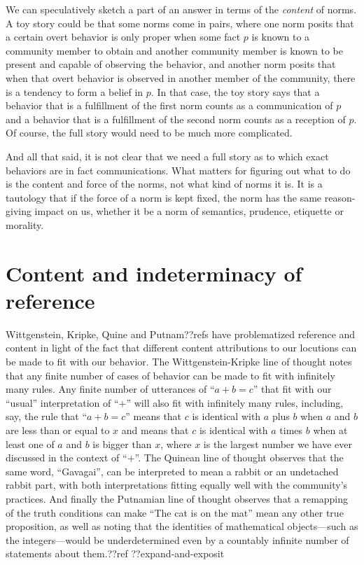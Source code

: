We can speculatively sketch a part of an answer in terms of the \textit{content} of norms. A toy story could be that 
some norms come in pairs, where one norm posits that a certain overt behavior is only proper when some fact $p$ is known to a 
community member to obtain and another community member is known to be present and capable of observing the behavior, and another 
norm posits that when that overt behavior is observed in another member of the community, there is a tendency to form a belief 
in $p$. In that case, the toy story says that a behavior that is a fulfillment of the first norm counts as a communication 
of $p$ and a behavior that is a fulfillment of the second norm counts as a reception of $p$. Of course, the full story would need
to be much more complicated.

And all that said, it is not clear that we need a full story as to which exact behaviors are in fact communications. What matters
for figuring out what to do is the content and force of the norms, not what kind of norms it is. It is a tautology that if the 
force of a norm is kept fixed, the norm has the same reason-giving impact on us, whether it be a norm of semantics, prudence, 
etiquette or morality. 

\section{Content and indeterminacy of reference}
Wittgenstein, Kripke, Quine and Putnam??refs have problematized reference and content in light of the fact that different
content attributions to our locutions can be made to fit with our behavior. The Wittgenstein-Kripke line of thought notes
that any finite number of cases of behavior can be made to fit with infinitely many rules. Any finite number of utterances
of ``$a+b=c$'' that fit with our ``usual'' interpretation of ``$+$'' will also fit with infinitely many rules, including,
say, the rule that ``$a+b=c$'' means that $c$ is identical with $a$ plus $b$ when $a$ and $b$ are less than or equal to $x$ and 
means that $c$ is identical with $a$ times $b$ when at least one of $a$ and $b$ is bigger than $x$, where $x$ is the largest
number we have ever discussed in the context of ``$+$''. The Quinean line of thought observes that the same word, ``Gavagai'',
can be interpreted to mean a rabbit or an undetached rabbit part, with both interpretations fitting equally well with the
community's practices. And finally the Putnamian line of thought observes that a remapping of the truth conditions can make
``The cat is on the mat'' mean any other true proposition, as well as noting that the identities of mathematical objects---such as
the integers---would be underdetermined even by a countably infinite number of statements about them.??ref ??expand-and-exposit

